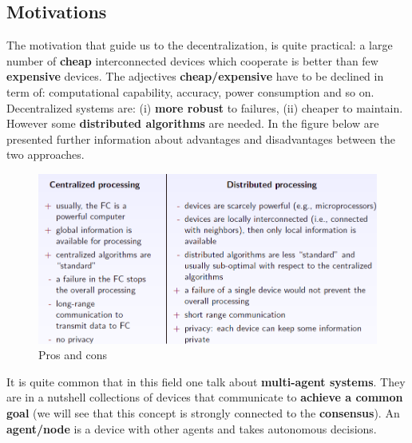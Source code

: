 \subsection{Motivations} 
The motivation that guide us to the decentralization, is quite practical: a large number of \textbf{cheap} interconnected devices which cooperate is better than few \textbf{expensive} devices. The adjectives \textbf{cheap/expensive} have to be declined in term of: computational capability, accuracy, power consumption and so on. Decentralized systems are: (i) \textbf{more robust} to failures, (ii) cheaper to maintain. However some \textbf{distributed algorithms} are needed.
In the figure below are presented further information about advantages and disadvantages between the two approaches.\\

\begin{figure}[h]
    \centering
    \includegraphics[scale=0.8]{images/Pros_Cons.png}
    \caption{Pros and cons}
\end{figure}


It is quite common that in this field one talk about \textbf{multi-agent systems}. They are in a nutshell collections of devices that communicate to \textbf{achieve a common goal} (we will see that this concept is strongly connected to the  \textbf{consensus}). An \textbf{agent/node} is a device with other agents and takes autonomous decisions. 

